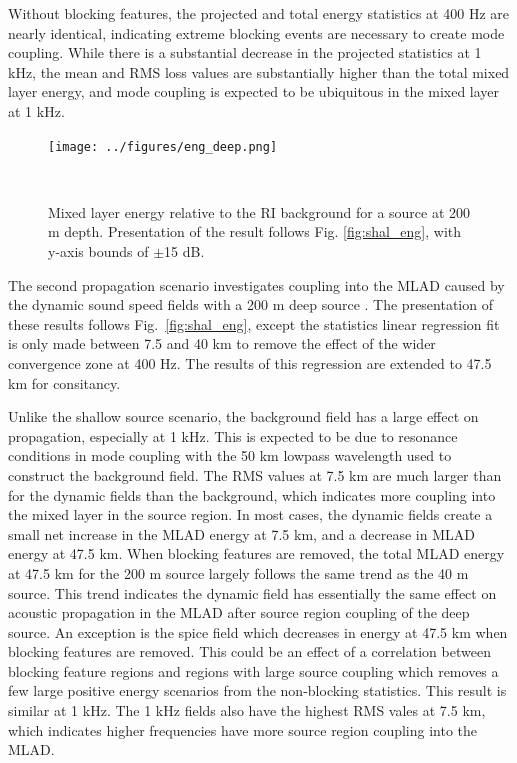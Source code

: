 \documentclass[preprint,NumberedRefs]{JASA}
\begin{document}
Without blocking features, the projected and total energy statistics at 400 Hz are nearly identical, indicating extreme blocking events are necessary to create mode coupling. While there is a substantial decrease in the projected statistics at 1 kHz, the mean and RMS loss values are substantially higher than the total mixed layer energy, and mode coupling is expected to be ubiquitous in the mixed layer at 1 kHz.

\begin{figure}
\texttt{[image: ../figures/eng\_deep.png]}
    \caption{Mixed layer energy relative to the RI background for a source at 200 m depth. Presentation of the result follows Fig. \ref{fig:shal_eng}, with y-axis bounds of $\pm$15 dB.}
    \label{fig:deep_proj}
\end{figure}
The second propagation scenario investigates coupling into the MLAD caused by the dynamic sound speed fields with a 200 m deep source . The presentation of these results follows Fig.~\ref{fig:shal_eng}, except the statistics linear regression fit is only made between 7.5 and 40 km to remove the effect of the wider convergence zone at 400 Hz. The results of this regression are extended to 47.5 km for consitancy.

Unlike the shallow source scenario, the background field has a large effect on propagation, especially at 1 kHz. This is expected to be due to resonance conditions in mode coupling with the 50 km lowpass wavelength used to construct the background field\cite{colosi21}. The RMS values at 7.5 km are much larger than for the dynamic fields than the background, which indicates more coupling into the mixed layer in the source region. In most cases, the dynamic fields create a small net increase in the MLAD energy at 7.5 km, and a decrease in MLAD energy at 47.5 km. When blocking features are removed, the total MLAD energy at 47.5 km for the 200 m source largely follows the same trend as the 40 m source. This trend indicates the dynamic field has essentially the same effect on acoustic propagation in the MLAD after source region coupling of the deep source. An exception is the spice field which decreases in energy at 47.5 km when blocking features are removed. This could be an effect of a correlation between blocking feature regions and regions with large source coupling which removes a few large positive energy scenarios from the non-blocking statistics. This result is similar at 1 kHz. The 1 kHz fields also have the highest RMS vales at 7.5 km, which indicates higher frequencies have more source region coupling into the MLAD.
\end{document}
